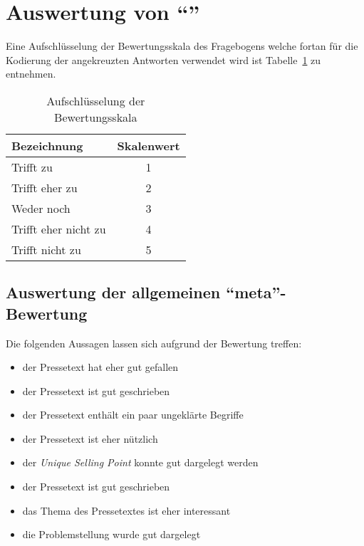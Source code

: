 


 





\section{Auswertung von \enquote{\varpressetext}}

Eine Aufschlüsselung der Bewertungsskala des Fragebogens welche fortan für die
Kodierung der angekreuzten Antworten verwendet wird ist
Tabelle~\ref{tab:skala} zu entnehmen.

\begin{table}[!ht]
    \caption{Aufschlüsselung der Bewertungsskala}
    \label{tab:skala}
    \begin{center}
        \begin{tabular}{lc}
        \toprule
        \textbf{Bezeichnung} & \textbf{Skalenwert} \\
        \midrule
        Trifft zu & 1 \\
        Trifft eher zu & 2 \\
        Weder noch & 3 \\
        Trifft eher nicht zu & 4 \\
        Trifft nicht zu & 5 \\
        \bottomrule
        \end{tabular}
    \end{center}
\end{table}

\subsection{Auswertung der allgemeinen \enquote{meta}-Bewertung}

Die folgenden Aussagen lassen sich aufgrund der Bewertung treffen:

\begin{itemize}
    \item der Pressetext hat eher gut gefallen
    \item der Pressetext ist gut geschrieben
    \item der Pressetext enthält ein paar ungeklärte Begriffe
    \item der Pressetext ist eher nützlich
    \item der \emph{Unique Selling Point} konnte gut dargelegt werden
    \item der Pressetext ist gut geschrieben
    \item das Thema des Pressetextes ist eher interessant
    \item die Problemstellung wurde gut dargelegt
\end{itemize}

